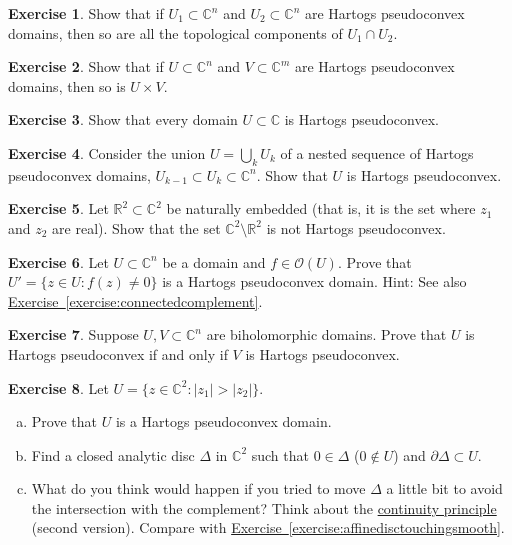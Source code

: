 \documentclass[12pt,openany]{book}
\newcommand{\sabs}[1]{\lvert {#1} \rvert}
\newcommand{\C}{{\mathbb{C}}}
\newcommand{\R}{{\mathbb{R}}}
\newcommand{\sO}{{\mathscr{O}}}
\theoremstyle{plain}
\theoremstyle{remark}
\theoremstyle{definition}
\newenvironment{exbox}{%
    \def\FrameCommand{\vrule width 1pt \relax\hspace{10pt}}%
    \MakeFramed{\advance\hsize-\width\FrameRestore}%
}{%
    \endMakeFramed
}
\newenvironment{exparts}{%
    \leavevmode\begin{enumerate}[a),noitemsep,topsep=0pt,parsep=0pt,partopsep=0pt]
}{%
    \end{enumerate}
}
\theoremstyle{exercise}
\newtheorem{exercise}{Exercise}[section]
\theoremstyle{example}
\newcommand{\exerciseref}[1]{\hyperref[#1]{Exercise~\ref*{#1}}}
\begin{document}
\begin{exbox}
\begin{exercise}
Show that if $U_1 \subset \C^n$ and $U_2 \subset \C^n$ are Hartogs
pseudoconvex domains, then so are all the topological components of $U_1 \cap U_2$.
\end{exercise}

\begin{exercise}
Show that if $U \subset \C^n$ and $V \subset \C^m$ are Hartogs
pseudoconvex domains, then so is $U \times V$.
\end{exercise}

\begin{exercise}
Show that every domain $U \subset \C$ is Hartogs pseudoconvex.
\end{exercise}

\begin{exercise} \label{exercise:nestedunions}
Consider the union $U = \bigcup_k U_k$ of a nested sequence of Hartogs pseudoconvex
domains, $U_{k-1} \subset U_k \subset \C^n$.  Show that $U$ is Hartogs pseudoconvex.
\end{exercise}

\begin{exercise}
Let $\R^2 \subset \C^2$ be naturally embedded (that is, it is the
set where $z_1$ and $z_2$ are real).  Show that the set $\C^2 \setminus
\R^2$ is not Hartogs pseudoconvex.
\end{exercise}

\begin{exercise}
Let $U \subset \C^n$ be a domain and $f \in \sO(U)$.  Prove that
$U' = \bigl\{ z \in U : f(z) \not= 0 \bigr\}$ is a Hartogs pseudoconvex
domain.  Hint: See also \exerciseref{exercise:connectedcomplement}.
\end{exercise}

\begin{exercise} \label{exercise:biholHartogs}
Suppose $U,V \subset \C^n$ are biholomorphic domains.
Prove that $U$ is Hartogs pseudoconvex if and only if $V$ is
Hartogs pseudoconvex.
\end{exercise}

\begin{exercise}
Let $U = \bigl\{ z \in \C^2 : \sabs{z_1} > \sabs{z_2} \bigr\}$.
\begin{exparts}
\item
Prove that $U$ is a Hartogs pseudoconvex domain.
\item
Find a closed analytic disc $\Delta$ in $\C^2$ such that $0 \in \Delta$ ($0
\notin U$)
and $\partial \Delta \subset U$.
\item
What do you think would happen if you tried to move $\Delta$ a
little bit to avoid the intersection with the complement?
Think about the \hyperref[thm:contprinciple2]{continuity principle}
(second version).
Compare with \exerciseref{exercise:affinedisctouchingsmooth}.
\end{exparts}
\end{exercise}


\end{exbox}
\end{document}
